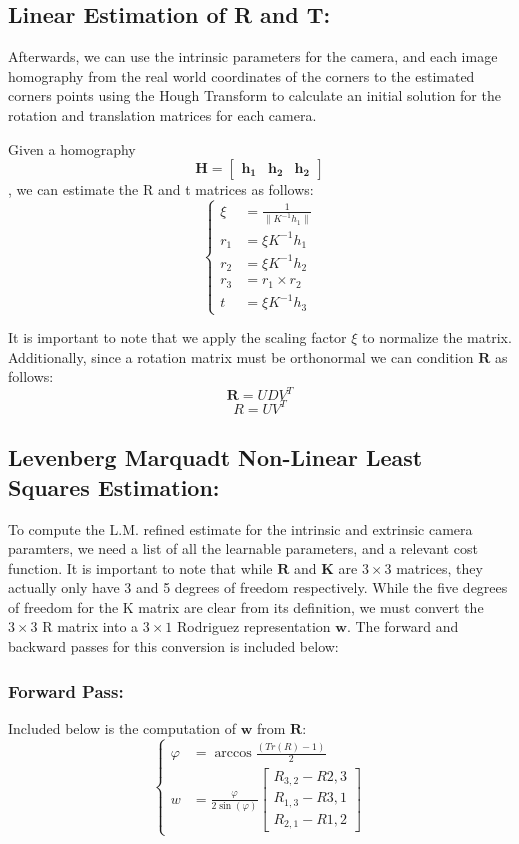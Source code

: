 \documentclass{article}
\begin{document}
\subsection{Linear Estimation of R and T:}
Afterwards, we can use the intrinsic parameters for the camera, and each image homography from the real world coordinates of the corners to the estimated corners points using the Hough Transform to calculate an initial solution for the rotation and translation matrices for each camera.

Given a homography \[\boldsymbol{H} = \begin{bmatrix}
    \boldsymbol{h_1} & \boldsymbol{h_2} & \boldsymbol{h_2}
\end{bmatrix}\], we can estimate the R and t matrices as follows:
\[\begin{cases}
    \xi & = \frac{1}{\| K^{-1} h_1\|} \\[10pt]
    r_1 & = \xi K^{-1} h_1 \\[10pt]
    r_2 & = \xi K^{-1} h_2 \\[10pt]
    r_3 & = r_1 \times r_2 \\[10pt]
    t & = \xi K^{-1} h_3
\end{cases}\]

It is important to note that we apply the scaling factor $\xi$ to normalize the matrix. Additionally, since a rotation matrix must be orthonormal we can condition $\boldsymbol{R}$ as follows:
\[\boldsymbol{R} = U D V^T\]
\[R = U V^T\]

\subsection{Levenberg Marquadt Non-Linear Least Squares Estimation:}
To compute the L.M. refined estimate for the intrinsic and extrinsic camera paramters, we need a list of all the learnable parameters, and a relevant cost function. It is important to note that while $\boldsymbol{R}$ and $\boldsymbol{K}$ are $3 \times 3$ matrices, they actually only have 3 and 5 degrees of freedom respectively. While the five degrees of freedom for the K matrix are clear from its definition, we must convert the $3 \times 3$ R matrix into a $3 \times 1$ Rodriguez representation $\boldsymbol{w}$. The forward and backward passes for this conversion is included below:

\subsubsection*{Forward Pass:}
Included below is the computation of $\boldsymbol{w}$ from $\boldsymbol{R}$:
\[\begin{cases}
    \varphi & = \arccos \frac{\left(Tr\left(R\right) - 1\right)}{2} \\[10pt]
    w  & = \frac{\varphi}{2 \sin\left(\varphi\right)} \begin{bmatrix}
        R_{3, 2} - R{2, 3} \\
        R_{1, 3} - R{3, 1} \\
        R_{2, 1} - R{1, 2}
    \end{bmatrix}
\end{cases}\]
\end{document}
